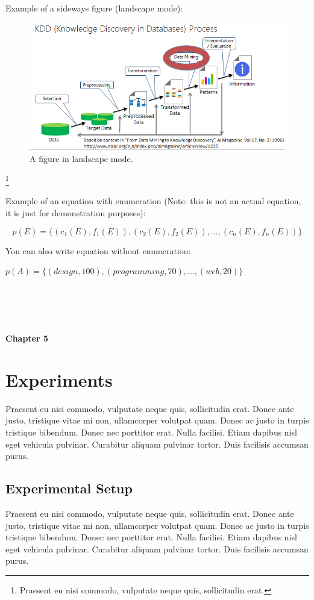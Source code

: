 \documentclass[12pt]{article}  %
\theoremstyle{plain}
\begin{document}
Example of a sideways figure (landscape mode):
\begin{figure}
\centering
\includegraphics[scale=.68]{images/kdd}
\caption{A figure in landscape mode. }
\label{patterns}
\end{figure}

\footnote{Praesent eu nisi commodo, vulputate neque quis, sollicitudin erat.}
 
Example of an equation with enumeration (Note: this is not an actual equation, it is just for demonstration purposes):

\begin{equation}
p(E) = \{ (c_1(E),f_1(E)),(c_2(E),f_2(E)),...,(c_n(E),f_n(E))\}
 \label{equ:interestidentification}
 \end{equation}

You can also write equation without enumeration:

$p(A) = \{ (design,100), (programming, 70),...,(web,20) \}$
   
\newpage
\newpage
\noindent
\\\\\\\\
{\LARGE \bf Chapter 5}
\section{Experiments}
\label{sec:experiment}
Praesent eu nisi commodo, vulputate neque quis, sollicitudin erat. Donec ante justo, tristique vitae mi non, ullamcorper volutpat quam. Donec ac justo in turpis tristique bibendum. Donec nec porttitor erat. Nulla facilisi. Etiam dapibus nisl eget vehicula pulvinar. Curabitur aliquam pulvinar tortor. Duis facilisis accumsan purus.

\subsection{Experimental Setup}
\label{section:experimental_setup}
Praesent eu nisi commodo, vulputate neque quis, sollicitudin erat. Donec ante justo, tristique vitae mi non, ullamcorper volutpat quam. Donec ac justo in turpis tristique bibendum. Donec nec porttitor erat. Nulla facilisi. Etiam dapibus nisl eget vehicula pulvinar. Curabitur aliquam pulvinar tortor. Duis facilisis accumsan purus.
\end{document}
